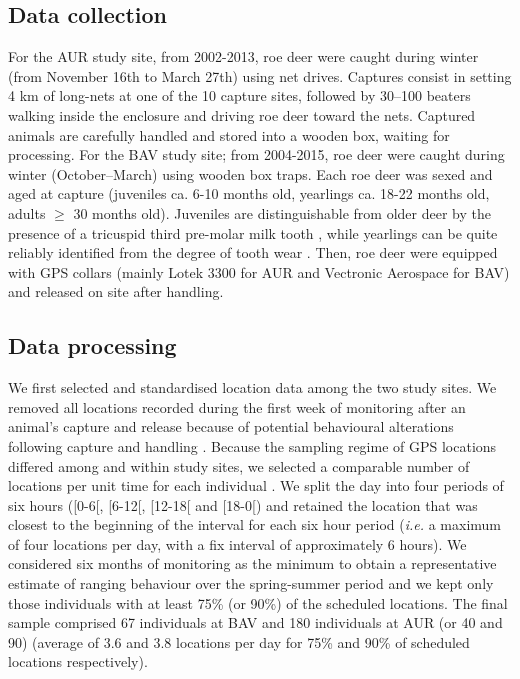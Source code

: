 \documentclass[a4paper,11pt]{article}
\begin{document}
\subsection*{Data collection}
For the AUR study site, from 2002-2013, roe deer were caught during
winter (from November 16th to March 27th) using net drives. Captures consist in setting 4 km of long-nets at one of the 10 capture sites, followed by 30--100
beaters walking inside the enclosure and driving roe deer toward the nets. Captured animals are carefully handled and stored into a wooden box, waiting for processing. For the BAV
study site; from 2004-2015, roe deer were caught during winter
(October–March) using wooden box traps. Each roe deer was sexed and
aged at capture (juveniles ca. 6-10 months old, yearlings ca. 18-22
months old, adults $\geq$ 30 months old). Juveniles are
distinguishable from older deer by the presence of a tricuspid third
pre-molar milk tooth \citep{ratcliffe_roe_1992}, while yearlings can
be quite reliably identified from the degree of tooth wear
\citep{hewison_tests_1999}. Then, roe deer were equipped with GPS collars
(mainly Lotek 3300 for AUR and Vectronic Aerospace for BAV) and
released on site after handling.

\subsection*{Data processing}
We first selected and standardised location data among the two study
sites. We removed all locations recorded during the first week of
monitoring after an animal’s capture and release because of potential
behavioural alterations following capture and handling
\citep{morellet_effect_2009}. Because the sampling regime of GPS
locations differed among and within study sites, we selected a
comparable number of locations per unit time for each individual
\citep{morellet_seasonality_2013}. We split the day into four periods
of six hours ([0-6[, [6-12[, [12-18[ and [18-0[) and retained the
location that was closest to the beginning of the interval for each
six hour period (\textit{i.e.} a maximum of four locations per day,
with a fix interval of approximately 6 hours). We considered six
months of monitoring as the minimum to obtain a representative
estimate of ranging behaviour over the spring-summer period and we
kept only those individuals with at least 75\% (or 90\%) of the
scheduled locations. The final sample comprised 67 individuals at BAV
and 180 individuals at AUR (or 40 and 90) (average of 3.6 and 3.8
locations per day for 75\% and 90\% of scheduled locations
respectively).
\end{document}
